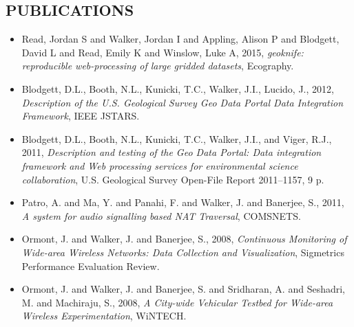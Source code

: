 \documentclass[line,margin]{res}
\begin{document}
\begin{resume}
\section{PUBLICATIONS}
	\begin{itemize} \itemsep -2pt
	\item Read, Jordan S and Walker, Jordan I and Appling, Alison P and Blodgett, David L and Read, Emily K and Winslow, Luke A, 2015, {\sl geoknife: reproducible web-processing of large gridded datasets}, Ecography.
	\item Blodgett, D.L., Booth, N.L., Kunicki, T.C., Walker, J.I., Lucido, J., 2012, {\sl Description of the U.S. Geological Survey Geo Data Portal Data Integration Framework}, IEEE JSTARS.
	\item Blodgett, D.L., Booth, N.L., Kunicki, T.C., Walker, J.I., and Viger, R.J., 2011, {\sl Description and testing of the Geo Data Portal: Data integration framework and Web processing services for environmental science collaboration}, U.S. Geological Survey Open-File Report 2011–1157, 9 p.
	\item Patro, A. and Ma, Y. and Panahi, F. and Walker, J. and Banerjee, S., 2011, {\sl A system for audio signalling based NAT Traversal}, COMSNETS.
    	 \item Ormont, J. and Walker, J. and Banerjee, S., 2008, {\sl Continuous Monitoring of Wide-area Wireless Networks: Data Collection and Visualization}, Sigmetrics Performance Evaluation Review.
	 \item Ormont, J. and Walker, J. and Banerjee, S. and Sridharan, A. and Seshadri, M. and Machiraju, S., 2008, {\sl A City-wide Vehicular Testbed for Wide-area Wireless Experimentation}, WiNTECH.
	\end{itemize}

\end{resume}
\end{document}
